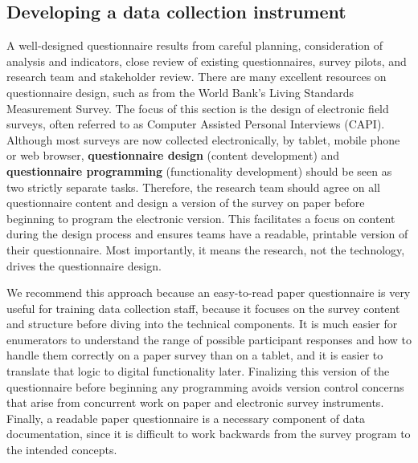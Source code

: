 \subsection{Developing a data collection instrument}

A well-designed questionnaire results from careful planning,
consideration of analysis and indicators,
close review of existing questionnaires,
survey pilots, and research team and stakeholder review.
There are many excellent resources on questionnaire design,
such as from the World Bank's Living Standards Measurement Survey.\cite{glewwe2000designing}
The focus of this section is the design of electronic field surveys,
often referred to as Computer Assisted Personal Interviews (CAPI).
Although most surveys are now collected electronically, by tablet, mobile phone or web browser,
\textbf{questionnaire design}
(content development) and \textbf{questionnaire programming} (functionality development)
should be seen as two strictly separate tasks.
Therefore, the research team should agree on all questionnaire content
and design a version of the survey on paper
before beginning to program the electronic version.
This facilitates a focus on content during the design process
and ensures teams have a readable, printable version of their questionnaire.
Most importantly, it means the research, not the technology,
drives the questionnaire design.

We recommend this approach because an easy-to-read paper questionnaire
is very useful for training data collection staff,
because it focuses on the survey content and structure
before diving into the technical components.
It is much easier for enumerators to understand
the range of possible participant responses
and how to handle them correctly on a paper survey than on a tablet,
and it is easier to translate that logic to digital functionality later.
Finalizing this version of the questionnaire before beginning any programming
avoids version control concerns that arise from concurrent work
on paper and electronic survey instruments.
Finally, a readable paper questionnaire is a necessary component of data documentation,
since it is difficult to work backwards from the survey program to the intended concepts.

